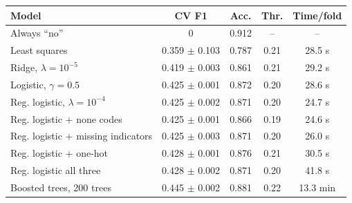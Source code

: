 \begin{tabular}{lcccc}
\hline
Model & CV F1 & Acc. & Thr. & Time/fold \\
\hline
Always ``no'' & 0 & 0.912 & -- & -- \\
Least squares & 0.359 $\pm$ 0.103 & 0.787 & 0.21 & 28.5 s \\
Ridge, $\lambda=10^{-5}$ & 0.419 $\pm$ 0.003 & 0.861 & 0.21 & 29.2 s \\
Logistic, $\gamma=0.5$ & 0.425 $\pm$ 0.001 & 0.872 & 0.20 & 28.6 s \\
Reg. logistic, $\lambda=10^{-4}$ & 0.425 $\pm$ 0.002 & 0.871 & 0.20 & 24.7 s \\
\hline
\quad Reg. logistic + none codes & 0.425 $\pm$ 0.001 & 0.866 & 0.19 & 24.6 s \\
\quad Reg. logistic + missing indicators & 0.425 $\pm$ 0.003 & 0.871 & 0.20 & 26.0 s \\
\quad Reg. logistic + one-hot & 0.428 $\pm$ 0.001 & 0.876 & 0.21 & 30.5 s \\
\quad Reg. logistic all three & 0.428 $\pm$ 0.002 & 0.871 & 0.20 & 41.8 s \\
\hline
Boosted trees, 200 trees & 0.445 $\pm$ 0.002 & 0.881 & 0.22 & 13.3 min \\
\hline
\end{tabular}
